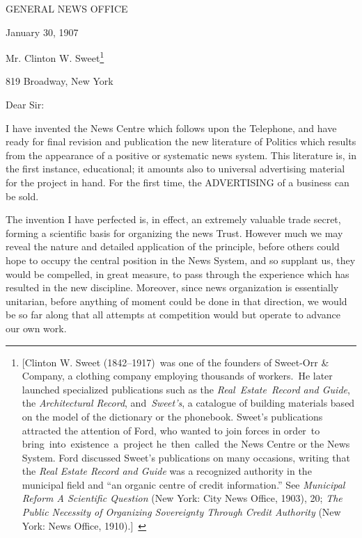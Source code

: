 \documentclass[openany,nobib]{tufte-book}
\begin{document}
\vspace{0.5in}

\begin{center}

\Large{GENERAL NEWS OFFICE~}

\end{center}

\hfill January 30, 1907

\vspace{0.2in}

\noindent Mr. Clinton W. Sweet\footnote{{[}Clinton W. Sweet (1842--1917)~was one
  of the founders of Sweet-Orr \& Company, a clothing company employing
  thousands of workers.~He later launched specialized publications such
  as the \emph{Real~Estate~Record and Guide}, the \emph{Architectural
  Record}, and~\emph{Sweet's}, a catalogue of building materials based
  on the model of the dictionary or the phonebook. Sweet's publications
  attracted the attention of Ford, who wanted to join forces in order~to
  bring~into~existence~a~project he~then~called~the News Centre or the
  News System. Ford discussed Sweet's publications on many occasions,
  writing that the \emph{Real Estate Record and Guide} was a recognized
  authority in the municipal field and ``an organic centre of credit
  information.'' See \emph{Municipal Reform A Scientific Question} (New
  York: City News Office, 1903), 20; \emph{The Public Necessity of
  Organizing Sovereignty Through Credit Authority} (New York: News
  Office, 1910).{]}~}

819 Broadway, New York~~

\vspace{0.2in}

\noindent Dear Sir:~

I have invented the News Centre which follows upon the Telephone, and
have ready for final revision and publication the new literature of
Politics which results from the appearance of a positive or systematic
news system. This literature is, in the first instance, educational; it
amounts also to universal advertising material for the project in hand.
For the first time, the ADVERTISING of a business can be sold.~

The invention I have perfected is, in effect, an extremely valuable
trade secret, forming a scientific basis for organizing the news Trust.
However much we may reveal the nature and detailed application of the
principle, before others could hope to occupy the central position in
the News System, and so supplant us, they would be compelled, in great
measure, to pass through the experience which has resulted in the new
discipline. Moreover, since news organization is essentially unitarian,
before anything of moment could be done in that direction, we would be
so far along that all attempts at competition would but operate to
advance our own work.~
\end{document}
